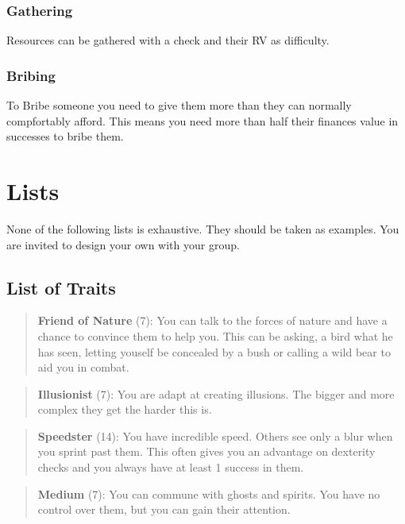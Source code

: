 \documentclass[11pt]{article}
\begin{document}
{\begin{multicols}{2}[]
\subsubsection{Gathering}
\label{sec:org7f41832}
Resources can be gathered with a check and their RV as difficulty.

\subsubsection{Bribing}
\label{sec:org34925a9}
To Bribe someone you need to give them more than they can normally compfortably afford. This means you need more than half their finances value in successes to bribe them.

\newpage
\section{Lists}
\label{sec:org333138c}
None of the following lists is exhaustive. They should be taken as examples. You are invited to design your own with your group.

\subsection{List of Traits}
\label{sec:org683491f}
\begin{quote}
\textbf{Friend of Nature} (7): You can talk to the forces of nature and have a chance to convince them to help you. This can be asking, a bird what he has seen, letting youself be concealed by a bush or calling a wild bear to aid you in combat.
\end{quote}

\begin{quote}
\textbf{Illusionist} (7): You are adapt at creating illusions. The bigger and more complex they get the harder this is.
\end{quote}

\begin{quote}
\textbf{Speedster} (14): You have incredible speed. Others see only a blur when you sprint past them. This often gives you an advantage on dexterity checks and you always have at least 1 success in them.
\end{quote}

\begin{quote}
\textbf{Medium} (7): You can commune with ghosts and spirits. You have no control over them, but you can gain their attention.
\end{quote}


\end{multicols}}
\end{document}
